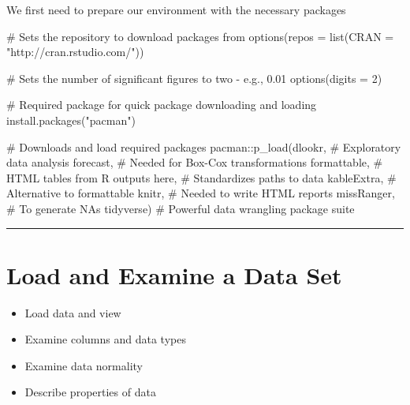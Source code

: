 \documentclass[
  letterpaper,
  DIV=11,
  numbers=noendperiod]{scrreprt}
\newenvironment{Shaded}{\begin{snugshade}}{\end{snugshade}}
\newcommand{\AttributeTok}[1]{\textcolor[rgb]{0.40,0.45,0.13}{#1}}
\newcommand{\CommentTok}[1]{\textcolor[rgb]{0.37,0.37,0.37}{#1}}
\newcommand{\DecValTok}[1]{\textcolor[rgb]{0.68,0.00,0.00}{#1}}
\newcommand{\FunctionTok}[1]{\textcolor[rgb]{0.28,0.35,0.67}{#1}}
\newcommand{\NormalTok}[1]{\textcolor[rgb]{0.00,0.23,0.31}{#1}}
\newcommand{\SpecialCharTok}[1]{\textcolor[rgb]{0.37,0.37,0.37}{#1}}
\newcommand{\StringTok}[1]{\textcolor[rgb]{0.13,0.47,0.30}{#1}}
\providecommand{\tightlist}{%
  \setlength{\itemsep}{0pt}\setlength{\parskip}{0pt}}\usepackage{longtable,booktabs,array}
\begin{document}
We first need to prepare our environment with the necessary packages

\begin{Shaded}
\begin{Highlighting}[]
\CommentTok{\# Sets the repository to download packages from}
\FunctionTok{options}\NormalTok{(}\AttributeTok{repos =} \FunctionTok{list}\NormalTok{(}\AttributeTok{CRAN =} \StringTok{"http://cran.rstudio.com/"}\NormalTok{))}

\CommentTok{\# Sets the number of significant figures to two {-} e.g., 0.01}
\FunctionTok{options}\NormalTok{(}\AttributeTok{digits =} \DecValTok{2}\NormalTok{)}

\CommentTok{\# Required package for quick package downloading and loading }
\FunctionTok{install.packages}\NormalTok{(}\StringTok{"pacman"}\NormalTok{)}

\CommentTok{\# Downloads and load required packages}
\NormalTok{pacman}\SpecialCharTok{::}\FunctionTok{p\_load}\NormalTok{(dlookr, }\CommentTok{\# Exploratory data analysis}
\NormalTok{               forecast, }\CommentTok{\# Needed for Box{-}Cox transformations}
\NormalTok{               formattable, }\CommentTok{\# HTML tables from R outputs}
\NormalTok{               here, }\CommentTok{\# Standardizes paths to data}
\NormalTok{               kableExtra, }\CommentTok{\# Alternative to formattable}
\NormalTok{               knitr, }\CommentTok{\# Needed to write HTML reports}
\NormalTok{               missRanger, }\CommentTok{\# To generate NAs}
\NormalTok{               tidyverse) }\CommentTok{\# Powerful data wrangling package suite}
\end{Highlighting}
\end{Shaded}

\begin{center}\rule{0.5\linewidth}{0.5pt}\end{center}

\hypertarget{load-and-examine-a-data-set-2}{%
\section{Load and Examine a Data
Set}\label{load-and-examine-a-data-set-2}}

\begin{itemize}
\tightlist
\item
  Load data and view
\item
  Examine columns and data types
\item
  Examine data normality
\item
  Describe properties of data
\end{itemize}
\end{document}
